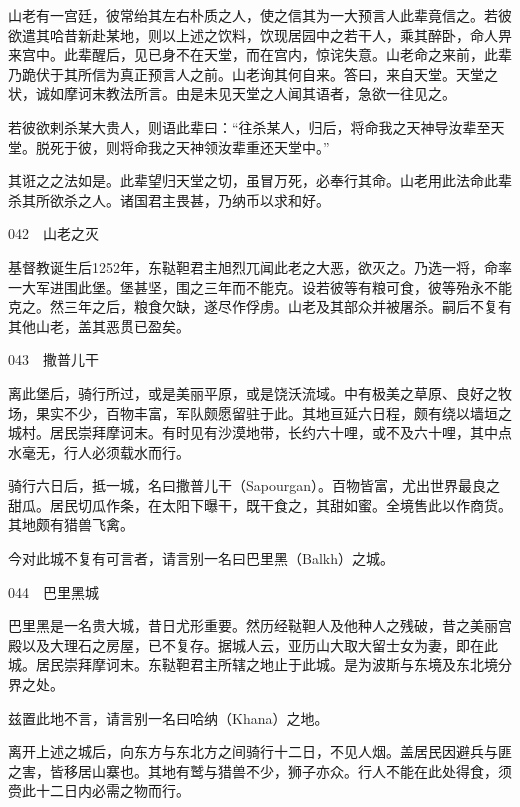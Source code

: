 \documentclass[12pt,UTF8]{ctexbook}
\begin{document}
山老有一宫廷，彼常绐其左右朴质之人，使之信其为一大预言人此辈竟信之。若彼欲遣其哈昔新赴某地，则以上述之饮料，饮现居园中之若干人，乘其醉卧，命人畀来宫中。此辈醒后，见已身不在天堂，而在宫内，惊诧失意。山老命之来前，此辈乃跪伏于其所信为真正预言人之前。山老询其何自来。答曰，来自天堂。天堂之状，诚如摩诃末教法所言。由是未见天堂之人闻其语者，急欲一往见之。

若彼欲剌杀某大贵人，则语此辈曰：“往杀某人，归后，将命我之天神导汝辈至天堂。脱死于彼，则将命我之天神领汝辈重还天堂中。”

其诳之之法如是。此辈望归天堂之切，虽冒万死，必奉行其命。山老用此法命此辈杀其所欲杀之人。诸国君主畏甚，乃纳币以求和好。





042　山老之灭

基督教诞生后1252年，东鞑靼君主旭烈兀闻此老之大恶，欲灭之。乃选一将，命率一大军进围此堡。堡甚坚，围之三年而不能克。设若彼等有粮可食，彼等殆永不能克之。然三年之后，粮食欠缺，遂尽作俘虏。山老及其部众并被屠杀。嗣后不复有其他山老，盖其恶贯已盈矣。





043　撒普儿干

离此堡后，骑行所过，或是美丽平原，或是饶沃流域。中有极美之草原、良好之牧场，果实不少，百物丰富，军队颇愿留驻于此。其地亘延六日程，颇有绕以墙垣之城村。居民崇拜摩诃末。有时见有沙漠地带，长约六十哩，或不及六十哩，其中点水毫无，行人必须载水而行。

骑行六日后，抵一城，名曰撒普儿干（Sapourgan）。百物皆富，尤出世界最良之甜瓜。居民切瓜作条，在太阳下曝干，既干食之，其甜如蜜。全境售此以作商货。其地颇有猎兽飞禽。

今对此城不复有可言者，请言别一名曰巴里黑（Balkh）之城。





044　巴里黑城

巴里黑是一名贵大城，昔日尤形重要。然历经鞑靼人及他种人之残破，昔之美丽宫殿以及大理石之房屋，已不复存。据城人云，亚历山大取大留士女为妻，即在此城。居民崇拜摩诃末。东鞑靼君主所辖之地止于此城。是为波斯与东境及东北境分界之处。

兹置此地不言，请言别一名曰哈纳（Khana）之地。

离开上述之城后，向东方与东北方之间骑行十二日，不见人烟。盖居民因避兵与匪之害，皆移居山寨也。其地有鹫与猎兽不少，狮子亦众。行人不能在此处得食，须赍此十二日内必需之物而行。
\end{document}
